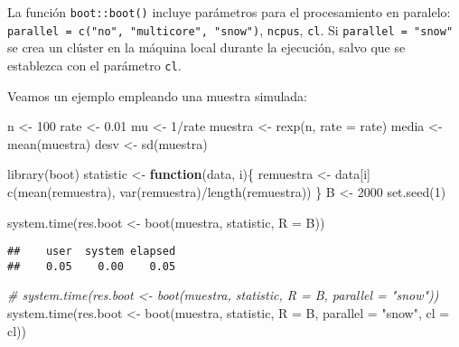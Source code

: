 \documentclass[
]{book}
\newenvironment{Shaded}{\begin{snugshade}}{\end{snugshade}}
\newcommand{\AttributeTok}[1]{\textcolor[rgb]{0.77,0.63,0.00}{#1}}
\newcommand{\CommentTok}[1]{\textcolor[rgb]{0.56,0.35,0.01}{\textit{#1}}}
\newcommand{\ControlFlowTok}[1]{\textcolor[rgb]{0.13,0.29,0.53}{\textbf{#1}}}
\newcommand{\DecValTok}[1]{\textcolor[rgb]{0.00,0.00,0.81}{#1}}
\newcommand{\FloatTok}[1]{\textcolor[rgb]{0.00,0.00,0.81}{#1}}
\newcommand{\FunctionTok}[1]{\textcolor[rgb]{0.00,0.00,0.00}{#1}}
\newcommand{\NormalTok}[1]{#1}
\newcommand{\OtherTok}[1]{\textcolor[rgb]{0.56,0.35,0.01}{#1}}
\newcommand{\SpecialCharTok}[1]{\textcolor[rgb]{0.00,0.00,0.00}{#1}}
\newcommand{\StringTok}[1]{\textcolor[rgb]{0.31,0.60,0.02}{#1}}
\theoremstyle{break}
\theoremstyle{definition}
\theoremstyle{definition}
\theoremstyle{definition}
\theoremstyle{definition}
\theoremstyle{remark}
\begin{document}
La función \texttt{boot::boot()} incluye parámetros para el procesamiento en paralelo:
\texttt{parallel\ =\ c("no",\ "multicore",\ "snow")}, \texttt{ncpus}, \texttt{cl}.
Si \texttt{parallel\ =\ "snow"} se crea un clúster en la máquina local durante la ejecución,
salvo que se establezca con el parámetro \texttt{cl}.

Veamos un ejemplo empleando una muestra simulada:

\begin{Shaded}
\begin{Highlighting}[]
\NormalTok{n }\OtherTok{\textless{}{-}} \DecValTok{100}
\NormalTok{rate }\OtherTok{\textless{}{-}} \FloatTok{0.01}
\NormalTok{mu }\OtherTok{\textless{}{-}} \DecValTok{1}\SpecialCharTok{/}\NormalTok{rate}
\NormalTok{muestra }\OtherTok{\textless{}{-}} \FunctionTok{rexp}\NormalTok{(n, }\AttributeTok{rate =}\NormalTok{ rate)}
\NormalTok{media }\OtherTok{\textless{}{-}} \FunctionTok{mean}\NormalTok{(muestra)}
\NormalTok{desv }\OtherTok{\textless{}{-}} \FunctionTok{sd}\NormalTok{(muestra)}

\FunctionTok{library}\NormalTok{(boot)}
\NormalTok{statistic }\OtherTok{\textless{}{-}} \ControlFlowTok{function}\NormalTok{(data, i)\{}
\NormalTok{  remuestra }\OtherTok{\textless{}{-}}\NormalTok{ data[i]}
  \FunctionTok{c}\NormalTok{(}\FunctionTok{mean}\NormalTok{(remuestra), }\FunctionTok{var}\NormalTok{(remuestra)}\SpecialCharTok{/}\FunctionTok{length}\NormalTok{(remuestra))}
\NormalTok{\}}
\NormalTok{B }\OtherTok{\textless{}{-}} \DecValTok{2000}
\FunctionTok{set.seed}\NormalTok{(}\DecValTok{1}\NormalTok{)}

\FunctionTok{system.time}\NormalTok{(res.boot }\OtherTok{\textless{}{-}} \FunctionTok{boot}\NormalTok{(muestra, statistic, }\AttributeTok{R =}\NormalTok{ B))}
\end{Highlighting}
\end{Shaded}

\begin{verbatim}
##    user  system elapsed 
##    0.05    0.00    0.05
\end{verbatim}

\begin{Shaded}
\begin{Highlighting}[]
\CommentTok{\# system.time(res.boot \textless{}{-} boot(muestra, statistic, R = B, parallel = "snow"))}
\FunctionTok{system.time}\NormalTok{(res.boot }\OtherTok{\textless{}{-}} \FunctionTok{boot}\NormalTok{(muestra, statistic, }\AttributeTok{R =}\NormalTok{ B, }\AttributeTok{parallel =} \StringTok{"snow"}\NormalTok{, }\AttributeTok{cl =}\NormalTok{ cl))}
\end{Highlighting}
\end{Shaded}
\end{document}
